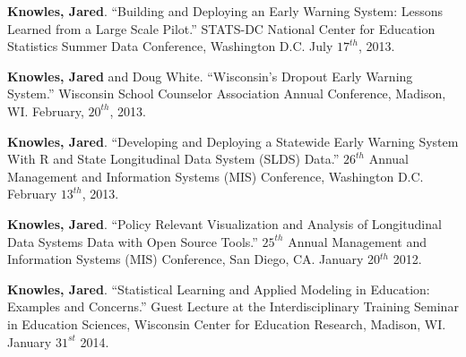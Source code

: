 \documentclass[margin,line]{res}
\begin{document}
\begin{resume}
\textbf{Knowles, Jared}. ``Building and Deploying an Early Warning System: Lessons Learned from a Large Scale Pilot.'' STATS-DC National Center for Education Statistics Summer Data Conference, Washington D.C. July $17^{th}$, 2013.

% 
\textbf{Knowles, Jared} and Doug White. ``Wisconsin's Dropout Early Warning System.'' Wisconsin School Counselor Association Annual Conference, Madison, WI. February, $20^{th}$, 2013. 


\textbf{Knowles, Jared}. ``Developing and Deploying a Statewide Early Warning System With R and State Longitudinal Data System (SLDS) Data.'' $26^{th}$ Annual Management and Information Systems (MIS) Conference, Washington D.C. February $13^{th}$, 2013.



\textbf{Knowles, Jared}. ``Policy Relevant Visualization and Analysis of Longitudinal Data Systems Data with Open Source Tools.'' $25^{th}$ Annual Management and Information Systems (MIS) Conference, San Diego, CA. January 20$^{th}$ 2012.

\textbf{Knowles, Jared}. ``Statistical Learning and Applied Modeling in Education: Examples 
and Concerns.'' Guest Lecture at the Interdisciplinary Training Seminar in Education Sciences, Wisconsin Center for Education Research, Madison, WI. January $31^{st}$ 2014.




\end{resume}
\end{document}
